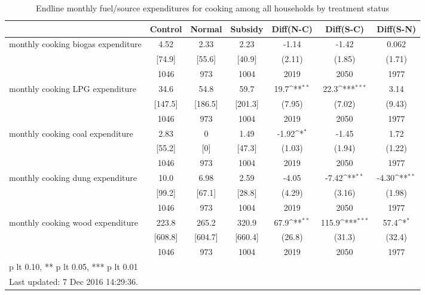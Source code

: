 \begin{table}[htbp]\centering
\def\sym#1{\ifmmode^{#1}\else\(^{#1}\)\fi}
\caption{Endline monthly fuel/source expenditures for cooking among all households by treatment status \label{tab:"balance"}}
\begin{tabular*}{1\hsize}{@{\hskip\tabcolsep\extracolsep\fill}l*{1}{cccccc}}
\toprule
                                &  Control&   Normal&  Subsidy&Diff(N-C)         &Diff(S-C)         &Diff(S-N)         \\
\midrule
monthly cooking biogas expenditure&     4.52&     2.33&     2.23&    -1.14         &    -1.42         &    0.062         \\
                                &   [74.9]&   [55.6]&   [40.9]&   (2.11)         &   (1.85)         &   (1.71)         \\
                                &     1046&      973&     1004&     2019         &     2050         &     1977         \\
monthly cooking LPG expenditure &     34.6&     54.8&     59.7&     19.7\sym{**} &     22.3\sym{***}&     3.14         \\
                                &  [147.5]&  [186.5]&  [201.3]&   (7.95)         &   (7.02)         &   (9.43)         \\
                                &     1046&      973&     1004&     2019         &     2050         &     1977         \\
monthly cooking coal expenditure&     2.83&        0&     1.49&    -1.92\sym{*}  &    -1.45         &     1.72         \\
                                &   [55.2]&      [0]&   [47.3]&   (1.03)         &   (1.94)         &   (1.22)         \\
                                &     1046&      973&     1004&     2019         &     2050         &     1977         \\
monthly cooking dung expenditure&     10.0&     6.98&     2.59&    -4.05         &    -7.42\sym{**} &    -4.30\sym{**} \\
                                &   [99.2]&   [67.1]&   [28.8]&   (4.29)         &   (3.16)         &   (1.98)         \\
                                &     1046&      973&     1004&     2019         &     2050         &     1977         \\
monthly cooking wood expenditure&    223.8&    265.2&    320.9&     67.9\sym{**} &    115.9\sym{***}&     57.4\sym{*}  \\
                                &  [608.8]&  [604.7]&  [660.4]&   (26.8)         &   (31.3)         &   (32.4)         \\
                                &     1046&      973&     1004&     2019         &     2050         &     1977         \\
\bottomrule
\multicolumn{7}{l}{\footnotesize * p lt 0.10, ** p lt 0.05, *** p lt 0.01}\\
\multicolumn{7}{l}{\footnotesize Last updated:  7 Dec 2016 14:29:36.}\\
\end{tabular*}
\end{table}
